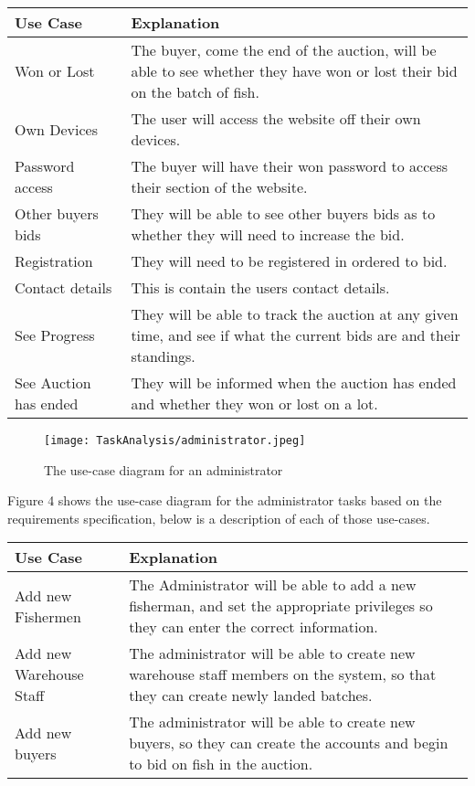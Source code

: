 \documentclass{article}
\begin{document}
\begin{center}
\begin{longtable}{p{6cm}|p{6cm}}
	\hline
	\hline Use Case & Explanation\\ \hline
	Won or Lost & The buyer, come the end of the auction, will be able to see whether they have won or lost their bid on the batch of fish.\\
	\hline
	Own Devices & The user will access the website off their own devices. \\
	\hline
	Password access & The buyer will have their won password to access their section of the website.\\
	\hline
	Other buyers bids & They will be able to see other buyers bids as to whether they will need to increase the bid. \\
	\hline
	Registration & They will need to be registered in ordered to bid. \\
	\hline
	Contact details & This is contain the users contact details.\\
	\hline 
	See Progress & They will be able to track the auction at any given time, and see if what the current bids are and their standings.\\
	\hline 
	See Auction has ended & They will be informed when the auction has ended and whether they won or lost on a lot.\\
	\hline 
	\hline
\end{longtable}
\end{center} 
\begin{figure}[htp]
\centering
\texttt{[image: TaskAnalysis/administrator.jpeg]}
\caption{The use-case diagram for an administrator}
\label{}
\end{figure}
Figure 4 shows the use-case diagram for the administrator tasks based on the requirements specification, below is a description of each of those use-cases.
\begin{center}
\begin{longtable}{p{6cm}|p{6cm}}
	\hline
	\hline Use Case & Explanation\\ \hline
	Add new Fishermen & The Administrator will be able to add a new fisherman, and set the appropriate privileges so they can enter the correct information.\\
	\hline
	Add new Warehouse Staff & The administrator will be able to create new warehouse staff members on the system, so that they can create newly landed batches.  \\
	\hline
	Add new buyers & The administrator will be able to create new buyers, so they can create the accounts and begin to bid on fish in the auction. \\
	\hline
	\hline
\end{longtable}
\end{center}\clearpage
\end{document}
